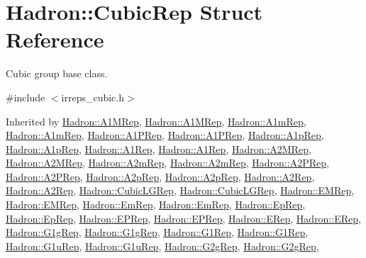 \hypertarget{structHadron_1_1CubicRep}{}\section{Hadron\+:\+:Cubic\+Rep Struct Reference}
\label{structHadron_1_1CubicRep}


Cubic group base class.  




{\ttfamily \#include $<$irreps\+\_\+cubic.\+h$>$}



Inherited by \mbox{\hyperlink{structHadron_1_1A1MRep}{Hadron\+::\+A1\+M\+Rep}}, \mbox{\hyperlink{structHadron_1_1A1MRep}{Hadron\+::\+A1\+M\+Rep}}, \mbox{\hyperlink{structHadron_1_1A1mRep}{Hadron\+::\+A1m\+Rep}}, \mbox{\hyperlink{structHadron_1_1A1mRep}{Hadron\+::\+A1m\+Rep}}, \mbox{\hyperlink{structHadron_1_1A1PRep}{Hadron\+::\+A1\+P\+Rep}}, \mbox{\hyperlink{structHadron_1_1A1PRep}{Hadron\+::\+A1\+P\+Rep}}, \mbox{\hyperlink{structHadron_1_1A1pRep}{Hadron\+::\+A1p\+Rep}}, \mbox{\hyperlink{structHadron_1_1A1pRep}{Hadron\+::\+A1p\+Rep}}, \mbox{\hyperlink{structHadron_1_1A1Rep}{Hadron\+::\+A1\+Rep}}, \mbox{\hyperlink{structHadron_1_1A1Rep}{Hadron\+::\+A1\+Rep}}, \mbox{\hyperlink{structHadron_1_1A2MRep}{Hadron\+::\+A2\+M\+Rep}}, \mbox{\hyperlink{structHadron_1_1A2MRep}{Hadron\+::\+A2\+M\+Rep}}, \mbox{\hyperlink{structHadron_1_1A2mRep}{Hadron\+::\+A2m\+Rep}}, \mbox{\hyperlink{structHadron_1_1A2mRep}{Hadron\+::\+A2m\+Rep}}, \mbox{\hyperlink{structHadron_1_1A2PRep}{Hadron\+::\+A2\+P\+Rep}}, \mbox{\hyperlink{structHadron_1_1A2PRep}{Hadron\+::\+A2\+P\+Rep}}, \mbox{\hyperlink{structHadron_1_1A2pRep}{Hadron\+::\+A2p\+Rep}}, \mbox{\hyperlink{structHadron_1_1A2pRep}{Hadron\+::\+A2p\+Rep}}, \mbox{\hyperlink{structHadron_1_1A2Rep}{Hadron\+::\+A2\+Rep}}, \mbox{\hyperlink{structHadron_1_1A2Rep}{Hadron\+::\+A2\+Rep}}, \mbox{\hyperlink{structHadron_1_1CubicLGRep}{Hadron\+::\+Cubic\+L\+G\+Rep}}, \mbox{\hyperlink{structHadron_1_1CubicLGRep}{Hadron\+::\+Cubic\+L\+G\+Rep}}, \mbox{\hyperlink{structHadron_1_1EMRep}{Hadron\+::\+E\+M\+Rep}}, \mbox{\hyperlink{structHadron_1_1EMRep}{Hadron\+::\+E\+M\+Rep}}, \mbox{\hyperlink{structHadron_1_1EmRep}{Hadron\+::\+Em\+Rep}}, \mbox{\hyperlink{structHadron_1_1EmRep}{Hadron\+::\+Em\+Rep}}, \mbox{\hyperlink{structHadron_1_1EpRep}{Hadron\+::\+Ep\+Rep}}, \mbox{\hyperlink{structHadron_1_1EpRep}{Hadron\+::\+Ep\+Rep}}, \mbox{\hyperlink{structHadron_1_1EPRep}{Hadron\+::\+E\+P\+Rep}}, \mbox{\hyperlink{structHadron_1_1EPRep}{Hadron\+::\+E\+P\+Rep}}, \mbox{\hyperlink{structHadron_1_1ERep}{Hadron\+::\+E\+Rep}}, \mbox{\hyperlink{structHadron_1_1ERep}{Hadron\+::\+E\+Rep}}, \mbox{\hyperlink{structHadron_1_1G1gRep}{Hadron\+::\+G1g\+Rep}}, \mbox{\hyperlink{structHadron_1_1G1gRep}{Hadron\+::\+G1g\+Rep}}, \mbox{\hyperlink{structHadron_1_1G1Rep}{Hadron\+::\+G1\+Rep}}, \mbox{\hyperlink{structHadron_1_1G1Rep}{Hadron\+::\+G1\+Rep}}, \mbox{\hyperlink{structHadron_1_1G1uRep}{Hadron\+::\+G1u\+Rep}}, \mbox{\hyperlink{structHadron_1_1G1uRep}{Hadron\+::\+G1u\+Rep}}, \mbox{\hyperlink{structHadron_1_1G2gRep}{Hadron\+::\+G2g\+Rep}}, \mbox{\hyperlink{structHadron_1_1G2gRep}{Hadron\+::\+G2g\+Rep}}, 